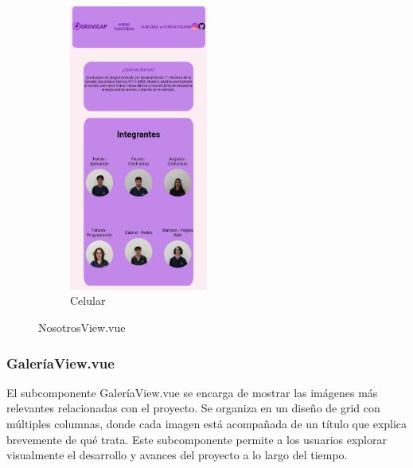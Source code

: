 \begin{figure} [H]
\begin{subfigure}{0.4\textwidth}
                        \includegraphics[width=0.5\textwidth]{Página Web/Celular/Integrantes.png}
                        \caption{Celular}
                        \label{fig:pw3.2}
                    \end{subfigure}
                    \hfill
                            
                    \caption{NosotrosView.vue}
                    \label{fig:pw3}
                    \end{figure}
                    
                \subsubsection{GaleríaView.vue}
                    El subcomponente GaleríaView.vue se encarga de mostrar las imágenes más relevantes relacionadas con el proyecto. Se organiza en un diseño de grid con múltiples columnas, donde cada imagen está acompañada de un título que explica brevemente de qué trata. Este subcomponente permite a los usuarios explorar visualmente el desarrollo y avances del proyecto a lo largo del tiempo.\par


